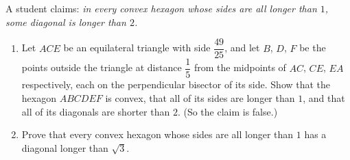 A student claims: \emph{in every convex hexagon whose sides are all longer than $1$, some diagonal is longer than $2$.}
\begin{enumerate}
\item[(a)] Let $ACE$ be an equilateral triangle with side $\dfrac{49}{25}$, and let $B$, $D$, $F$ be the points outside the triangle at distance $\dfrac{1}{5}$ from the midpoints of $AC$, $CE$, $EA$ respectively, each on the perpendicular bisector of its side. Show that the hexagon $ABCDEF$ is convex, that all of its sides are longer than $1$, and that all of its diagonals are shorter than $2$. (So the claim is false.)
\item[(b)] Prove that every convex hexagon whose sides are all longer than $1$ has a diagonal longer than $\sqrt3$.
\end{enumerate}
